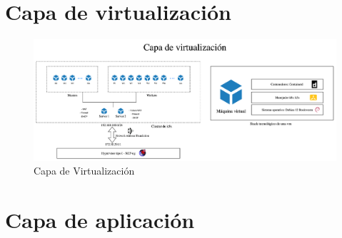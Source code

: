 \section{Capa de virtualización}

\begin{figure}[H]
    \centering
    \includegraphics[width=\textwidth]{tablas-images/cp6/disenio-N2.png}
    \caption{Capa de Virtualización}
\end{figure}

\section{Capa de aplicación}
